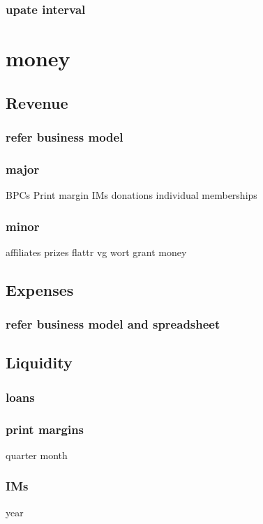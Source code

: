 \documentclass[output=guidelines,guidelines] {langscibook}
\begin{document}
\subsubsection{upate interval}
\section{money}
\subsection{Revenue}
\subsubsection{refer business model}
\subsubsection{major}
                    BPCs
                    Print margin
                    IMs
                    donations
                    individual memberships
\subsubsection{minor}
                    affiliates
                    prizes
                    flattr
                    vg wort
                    grant money
\subsection{Expenses}
\subsubsection{refer business model and spreadsheet}
\subsection{Liquidity}
\subsubsection{loans}
\subsubsection{print margins}
                    quarter
                    month
\subsubsection{IMs}
                    year
\end{document}
